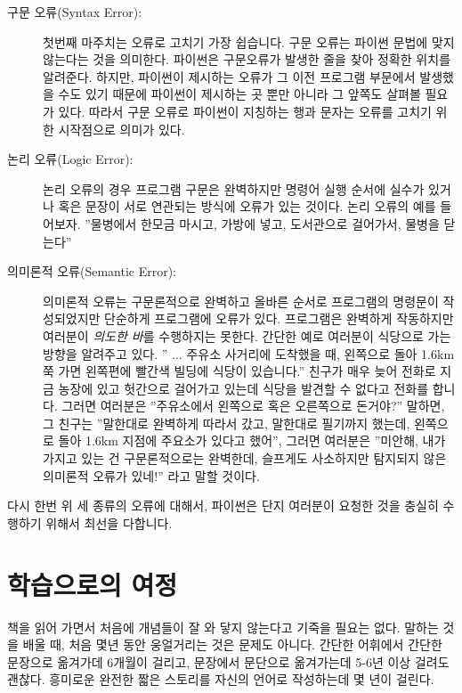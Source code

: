 \begin{description}

\item[구문 오류(Syntax Error):] 첫번째 마주치는 오류로 고치기 가장 쉽습니다. 
구문 오류는 파이썬 문법에 맞지 않는다는 것을 의미한다. 
파이썬은 구문오류가 발생한 줄을 찾아 정확한 위치를 알려준다. 
하지만, 파이썬이 제시하는 오류가 그 이전 프로그램 부문에서 발생했을 수도 있기 때문에 파이썬이 제시하는 곳 뿐만 아니라 그 앞쪽도 살펴볼 필요가 있다. 
따라서 구문 오류로 파이썬이 지칭하는 행과 문자는 오류를 고치기 위한 시작점으로 의미가 있다.

\item[논리 오류(Logic Error):] 논리 오류의 경우 프로그램 구문은 완벽하지만 명령어 실행 순서에 실수가 있거나 혹은 
문장이 서로 연관되는 방식에 오류가 있는 것이다.
논리 오류의 예를 들어보자. ''물병에서 한모금 마시고, 가방에 넣고, 도서관으로 걸어가서, 물병을 닫는다''

\item[의미론적 오류(Semantic Error):] 의미론적 오류는 구문론적으로 완벽하고 올바른 순서로 프로그램의 명령문이 작성되었지만 단순하게 프로그램에 오류가 있다. 
프로그램은 완벽하게 작동하지만 여러분이 \emph{의도한 바}를 수행하지는 못한다. 
간단한 예로 여러분이 식당으로 가는 방향을 알려주고 있다. 
'' ... 주유소 사거리에 도착했을 때, 왼쪽으로 돌아 1.6km 쭉 가면 왼쪽편에 빨간색 빌딩에 식당이 있습니다.'' 
친구가 매우 늦어 전화로 지금 농장에 있고 헛간으로 걸어가고 있는데 식당을 발견할 수 없다고 전화를 합니다. 
그러면 여러분은 ''주유소에서 왼쪽으로 혹은 오른쪽으로 돈거야?'' 말하면, 
그 친구는 ''말한대로 완벽하게 따라서 갔고, 말한대로 필기까지 했는데, 왼쪽으로 돌아 1.6km 지점에 주요소가 있다고 했어'', 
그러면 여러분은 ''미안해, 내가 가지고 있는 건 구문론적으로는 완벽한데, 슬프게도 사소하지만 탐지되지 않은 의미론적 오류가 있네!'' 라고 말할 것이다.

\end{description}

다시 한번 위 세 종류의 오류에 대해서, 파이썬은 단지 여러분이 요청한 것을 충실히 수행하기 위해서 최선을 다합니다.

\section{학습으로의 여정}

책을 읽어 가면서 처음에 개념들이 잘 와 닿지 않는다고 기죽을 필요는 없다. 
말하는 것을 배울 때, 처음 몇년 동안 웅얼거리는 것은 문제도 아니다. 
간단한 어휘에서 간단한 문장으로 옮겨가데 6개월이 걸리고,
문장에서 문단으로 옮겨가는데 5-6년 이상 걸려도 괜찮다. 
흥미로운 완전한 짧은 스토리를 자신의 언어로 작성하는데 몇 년이 걸린다.

